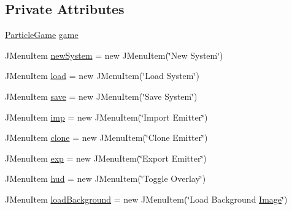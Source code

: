 \subsection*{Private Attributes}
\begin{DoxyCompactItemize}
\item 
\mbox{\hyperlink{classorg_1_1newdawn_1_1slick_1_1tools_1_1peditor_1_1_particle_game}{Particle\+Game}} \mbox{\hyperlink{classorg_1_1newdawn_1_1slick_1_1tools_1_1peditor_1_1_particle_editor_a30ffb1c9b34c421c0ef6a28efbaaa450}{game}}
\item 
J\+Menu\+Item \mbox{\hyperlink{classorg_1_1newdawn_1_1slick_1_1tools_1_1peditor_1_1_particle_editor_a2e4870f358024190199206a73bfc4654}{new\+System}} = new J\+Menu\+Item(\char`\"{}New System\char`\"{})
\item 
J\+Menu\+Item \mbox{\hyperlink{classorg_1_1newdawn_1_1slick_1_1tools_1_1peditor_1_1_particle_editor_afec7a34976e3755a6398e1f53942f576}{load}} = new J\+Menu\+Item(\char`\"{}Load System\char`\"{})
\item 
J\+Menu\+Item \mbox{\hyperlink{classorg_1_1newdawn_1_1slick_1_1tools_1_1peditor_1_1_particle_editor_a69669b7e0bce5357cc8aff53f50e4ab0}{save}} = new J\+Menu\+Item(\char`\"{}Save System\char`\"{})
\item 
J\+Menu\+Item \mbox{\hyperlink{classorg_1_1newdawn_1_1slick_1_1tools_1_1peditor_1_1_particle_editor_a0390da399423359c2c2a9eb9a859dfa9}{imp}} = new J\+Menu\+Item(\char`\"{}Import Emitter\char`\"{})
\item 
J\+Menu\+Item \mbox{\hyperlink{classorg_1_1newdawn_1_1slick_1_1tools_1_1peditor_1_1_particle_editor_a502b67d855f211caa40e7599d11b519c}{clone}} = new J\+Menu\+Item(\char`\"{}Clone Emitter\char`\"{})
\item 
J\+Menu\+Item \mbox{\hyperlink{classorg_1_1newdawn_1_1slick_1_1tools_1_1peditor_1_1_particle_editor_a2e2c4a9bac386c62527398c559eee09f}{exp}} = new J\+Menu\+Item(\char`\"{}Export Emitter\char`\"{})
\item 
J\+Menu\+Item \mbox{\hyperlink{classorg_1_1newdawn_1_1slick_1_1tools_1_1peditor_1_1_particle_editor_aa06f7076cc0e6363346bb89af6d312e6}{hud}} = new J\+Menu\+Item(\char`\"{}Toggle Overlay\char`\"{})
\item 
J\+Menu\+Item \mbox{\hyperlink{classorg_1_1newdawn_1_1slick_1_1tools_1_1peditor_1_1_particle_editor_a49116b943662ca3b8cccfc0ecd95eeff}{load\+Background}} = new J\+Menu\+Item(\char`\"{}Load Background \mbox{\hyperlink{classorg_1_1newdawn_1_1slick_1_1_image}{Image}}\char`\"{})
\item 

\end{DoxyCompactItemize}
